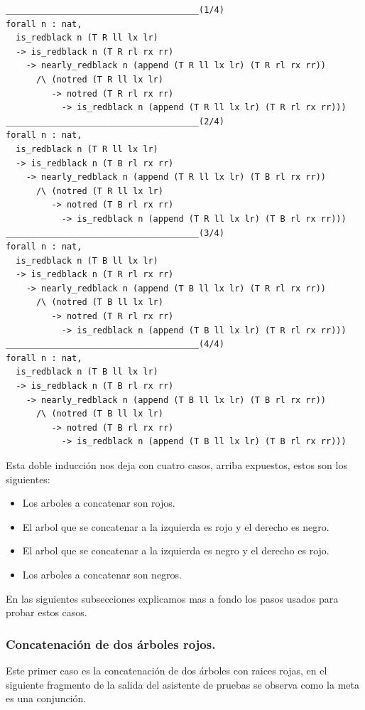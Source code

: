 \documentclass[8pt,leqno,pdflatex,spanish]{book}
\theoremstyle{plain}
\theoremstyle{definition}
\theoremstyle{remark}
\begin{document}
\begin{verbatim}
______________________________________(1/4)
forall n : nat,
  is_redblack n (T R ll lx lr)
  -> is_redblack n (T R rl rx rr)
    -> nearly_redblack n (append (T R ll lx lr) (T R rl rx rr))
      /\ (notred (T R ll lx lr)
         -> notred (T R rl rx rr)
           -> is_redblack n (append (T R ll lx lr) (T R rl rx rr)))
______________________________________(2/4)
forall n : nat,
  is_redblack n (T R ll lx lr)
  -> is_redblack n (T B rl rx rr)
    -> nearly_redblack n (append (T R ll lx lr) (T B rl rx rr))
      /\ (notred (T R ll lx lr)
         -> notred (T B rl rx rr)
           -> is_redblack n (append (T R ll lx lr) (T B rl rx rr)))
______________________________________(3/4)
forall n : nat,
  is_redblack n (T B ll lx lr)
  -> is_redblack n (T R rl rx rr)
    -> nearly_redblack n (append (T B ll lx lr) (T R rl rx rr))
      /\ (notred (T B ll lx lr)
         -> notred (T R rl rx rr)
           -> is_redblack n (append (T B ll lx lr) (T R rl rx rr)))
______________________________________(4/4)
forall n : nat,
  is_redblack n (T B ll lx lr)
  -> is_redblack n (T B rl rx rr)
    -> nearly_redblack n (append (T B ll lx lr) (T B rl rx rr))
      /\ (notred (T B ll lx lr)
         -> notred (T B rl rx rr)
           -> is_redblack n (append (T B ll lx lr) (T B rl rx rr)))
\end{verbatim}

Esta doble inducci\'on nos deja con cuatro casos, arriba expuestos, estos son los siguientes:
\begin{itemize}
    \item Los arboles a concatenar son rojos.
    \item El arbol que se concatenar a la izquierda es rojo y el derecho es negro.
    \item El arbol que se concatenar a la izquierda es negro y el derecho es rojo.
    \item Los arboles a concatenar son negros.
\end{itemize}

En las siguientes subsecciones explicamos mas a fondo los pasos usados para probar estos casos.


\subsubsection{Concatenaci\'on de dos \'arboles rojos.} 

Este primer caso es la concatenaci\'on de dos \'arboles con raices rojas, en el siguiente 
fragmento de la salida del asistente de pruebas se observa como la meta es una conjunci\'on.
\end{document}
